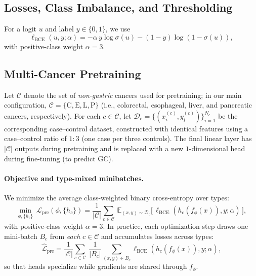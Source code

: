 \documentclass[journal,article,submit,pdftex,moreauthors]{Definitions/mdpi}
\begin{document}
\subsection{Losses, Class Imbalance, and Thresholding}
For a logit $u$ and label $y\in\{0,1\}$, we use
\begin{equation}
\ell_{\mathrm{BCE}}(u,y;\alpha)=-\alpha\,y\log\sigma(u)-(1-y)\log(1-\sigma(u)),
\end{equation}
with positive-class weight $\alpha{=}3$.

\subsection{Multi-Cancer Pretraining}\label{sec:pretrain_multi}
Let $\mathcal{C}$ denote the set of \emph{non-gastric} cancers used for pretraining; in our main configuration, $\mathcal{C}=\{\mathrm{C},\mathrm{E},\mathrm{L},\mathrm{P}\}$ (i.e., colorectal, esophageal, liver, and pancreatic cancers, respectively).
For each $c\in\mathcal{C}$, let $\mathcal{D}_c=\{(x_i^{(c)},y_i^{(c)})\}_{i=1}^{N_c}$ be the corresponding case--control dataset, constructed with identical features using a case--control ratio of $1{:}3$ (one case per three controls).
The final linear layer has $|\mathcal{C}|$ outputs during pretraining and is replaced with a new $1$-dimensional head during fine-tuning (to predict GC).



\paragraph{Objective and type-mixed minibatches.}
We minimize the average class-weighted binary cross-entropy over types:
\begin{equation}
\label{eq:pre_obj}
\min_{\phi,\{h_c\}}\ \mathcal{L}_{\mathrm{pre}}(\phi,\{h_c\})=\frac{1}{|\mathcal{C}|}\sum_{c\in\mathcal{C}} \ \mathbb{E}_{(x,y)\sim\mathcal{D}_c}\!\big[\,\ell_{\mathrm{BCE}}(h_c(f_\phi(x)),y;\alpha)\,\big],
\end{equation}
with positive-class weight $\alpha{=}3$. In practice, each optimization step draws one mini-batch $B_c$ from \emph{each} $c\in\mathcal{C}$ and accumulates losses across types:
\begin{equation}
\label{eq:pre_mix}
\hat{\mathcal{L}}_{\mathrm{pre}}=\frac{1}{|\mathcal{C}|}\sum_{c\in\mathcal{C}}\ \frac{1}{|B_c|}\sum_{(x,y)\in B_c}\ell_{\mathrm{BCE}}(h_c(f_\phi(x)),y;\alpha),
\end{equation}
so that heads specialize while gradients are shared through $f_\phi$.
\end{document}
